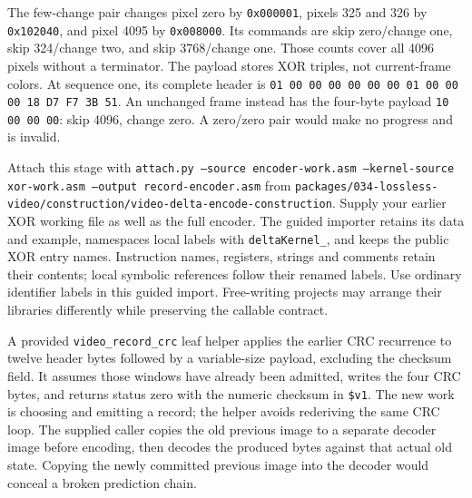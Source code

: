 The few-change pair changes pixel zero by \texttt{0x000001}, pixels 325 and 326
by \texttt{0x102040}, and pixel 4095 by \texttt{0x008000}. Its commands are
skip zero/change one, skip 324/change two, and skip 3768/change one. Those counts
cover all 4096 pixels without a terminator. The payload stores XOR triples, not
current-frame colors. At sequence one, its complete header is
\texttt{01 00 00 00 00 00 00 01 00 00 00 18 D7 F7 3B 51}.
An unchanged frame instead has the four-byte payload \texttt{10 00 00 00}:
skip 4096, change zero. A zero/zero pair would make no progress and is invalid.

Attach this stage with \texttt{attach.py --source encoder-work.asm --kernel-source
  xor-work.asm --output record-encoder.asm} from
\texttt{packages/034-lossless-video/construction/video-delta-encode-construction}. Supply your earlier XOR working
file as well as the full encoder. The guided importer retains its data and example,
namespaces local labels with \texttt{deltaKernel\_}, and keeps the public XOR entry
names. Instruction names, registers, strings and comments retain their contents;
local symbolic references follow their renamed labels. Use ordinary identifier
labels in this guided import. Free-writing projects may arrange their libraries
differently while preserving the callable contract.

A provided \texttt{video\_record\_crc} leaf helper applies the earlier CRC recurrence
to twelve header bytes followed by a variable-size payload, excluding the checksum
field. It assumes those windows have already been admitted, writes the four CRC
bytes, and returns status zero with the numeric checksum in \texttt{\$v1}. The
new work is choosing and emitting a record; the helper avoids rederiving the same
CRC loop. The supplied caller copies the old previous image to a separate decoder
image before encoding, then decodes the produced bytes against that actual old
state. Copying the newly committed previous image into the decoder would conceal
a broken prediction chain.
